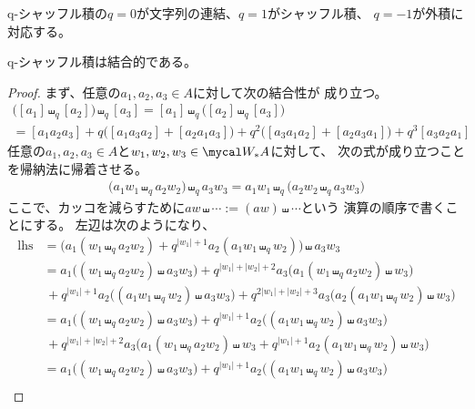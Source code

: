 {	q-シャッフル積の$q=0$が文字列の連結、$q=1$がシャッフル積、
	$q=-1$が外積に対応する。

	\begin{proposition}[q-シャッフル積は積]\label{prop:q-シャッフル積は積} %
		q-シャッフル積は結合的である。
	\end{proposition} %
	\begin{proof} まず、任意の$a_1,a_2,a_3\in A$に対して次の結合性が
	成り立つ。
	\begin{equation*}\begin{split}
		\bigl([a_1]\shuffle_q[a_2]\bigr)\shuffle_q[a_3]
		= [a_1]\shuffle_q\bigl([a_2]\shuffle_q[a_3]\bigr) \\
		= [a_1a_2a_3] + q\bigl([a_1a_3a_2] + [a_2a_1a_3]\bigr)
		+ q^2\bigl([a_3a_1a_2] + [a_2a_3a_1]\bigr) + q^3[a_3a_2a_1]
	\end{split}\end{equation*}
	任意の$a_1,a_2,a_3\in A$と$w_1,w_2,w_3\in \W_*A$に対して、
	次の式が成り立つことを帰納法に帰着させる。
	\begin{equation}\label{eq:q-シャッフル積の結合性}\begin{split}
		\bigl(a_1w_1\shuffle_qa_2w_2\bigr)\shuffle_qa_3w_3
		= a_1w_1\shuffle_q\bigl(a_2w_2\shuffle_qa_3w_3\bigr)
	\end{split}\end{equation}
	ここで、カッコを減らすために$aw\shuffle\cdots:=(aw)\shuffle\cdots$という
	演算の順序で書くことにする。
	左辺は次のようになり、
	\begin{equation*}\begin{split}
		\text{lhs} &= \bigl(a_1(w_1\shuffle_qa_2w_2)
			+ q^{|w_1|+1}a_2(a_1w_1\shuffle_qw_2)\bigr)\shuffle a_3w_3 \\
		&= a_1 \bigl((w_1\shuffle_qa_2w_2)\shuffle a_3w_3\bigr)
			+ q^{|w_1|+|w_2|+2}
			a_3 \bigl(a_1(w_1\shuffle_qa_2w_2)\shuffle w_3\bigr) \\
		&\,+ q^{|w_1|+1}a_2\bigl((a_1w_1\shuffle_qw_2)\shuffle a_3w_3\bigr)
			+ q^{2|w_1|+|w_2|+3}
			a_3\bigl(a_2(a_1w_1\shuffle_qw_2)\shuffle w_3\bigr) \\
		&= a_1 \bigl((w_1\shuffle_qa_2w_2)\shuffle a_3w_3\bigr)
			+ q^{|w_1|+1}a_2\bigl((a_1w_1\shuffle_qw_2)\shuffle a_3w_3\bigr) \\
		&\,+ q^{|w_1|+|w_2|+2}
			a_3 \bigl(a_1(w_1\shuffle_qa_2w_2)\shuffle w_3
			+ q^{|w_1|+1} a_2(a_1w_1\shuffle_qw_2)\shuffle w_3\bigr) \\
		&= a_1 \bigl((w_1\shuffle_qa_2w_2)\shuffle a_3w_3\bigr)
			+ q^{|w_1|+1}a_2\bigl((a_1w_1\shuffle_qw_2)\shuffle a_3w_3\bigr) \\

\end{split}
\end{equation*}
\end{proof}}
